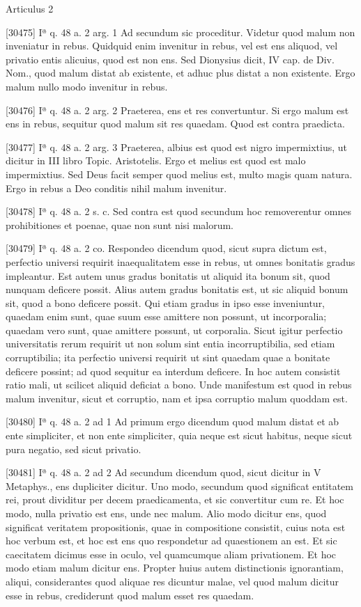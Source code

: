 \documentclass[paper=a4paper,fontsize=10pt,jafontsize=9pt,titlepage]{jlreq}
\begin{document}
Articulus 2

[30475] Iª q. 48 a. 2 arg. 1 Ad secundum sic proceditur. Videtur quod malum non inveniatur in rebus. Quidquid enim invenitur in rebus, vel est ens aliquod, vel privatio entis alicuius, quod est non ens. Sed Dionysius dicit, IV cap. de Div. Nom., quod malum distat ab existente, et adhuc plus distat a non existente. Ergo malum nullo modo invenitur in rebus.

[30476] Iª q. 48 a. 2 arg. 2 Praeterea, ens et res convertuntur. Si ergo malum est ens in rebus, sequitur quod malum sit res quaedam. Quod est contra praedicta.

[30477] Iª q. 48 a. 2 arg. 3 Praeterea, albius est quod est nigro impermixtius, ut dicitur in III libro Topic. Aristotelis. Ergo et melius est quod est malo impermixtius. Sed Deus facit semper quod melius est, multo magis quam natura. Ergo in rebus a Deo conditis nihil malum invenitur.

[30478] Iª q. 48 a. 2 s. c. Sed contra est quod secundum hoc removerentur omnes prohibitiones et poenae, quae non sunt nisi malorum.

[30479] Iª q. 48 a. 2 co. Respondeo dicendum quod, sicut supra dictum est, perfectio universi requirit inaequalitatem esse in rebus, ut omnes bonitatis gradus impleantur. Est autem unus gradus bonitatis ut aliquid ita bonum sit, quod nunquam deficere possit. Alius autem gradus bonitatis est, ut sic aliquid bonum sit, quod a bono deficere possit. Qui etiam gradus in ipso esse inveniuntur, quaedam enim sunt, quae suum esse amittere non possunt, ut incorporalia; quaedam vero sunt, quae amittere possunt, ut corporalia. Sicut igitur perfectio universitatis rerum requirit ut non solum sint entia incorruptibilia, sed etiam corruptibilia; ita perfectio universi requirit ut sint quaedam quae a bonitate deficere possint; ad quod sequitur ea interdum deficere. In hoc autem consistit ratio mali, ut scilicet aliquid deficiat a bono. Unde manifestum est quod in rebus malum invenitur, sicut et corruptio, nam et ipsa corruptio malum quoddam est.

[30480] Iª q. 48 a. 2 ad 1 Ad primum ergo dicendum quod malum distat et ab ente simpliciter, et non ente simpliciter, quia neque est sicut habitus, neque sicut pura negatio, sed sicut privatio.

[30481] Iª q. 48 a. 2 ad 2 Ad secundum dicendum quod, sicut dicitur in V Metaphys., ens dupliciter dicitur. Uno modo, secundum quod significat entitatem rei, prout dividitur per decem praedicamenta, et sic convertitur cum re. Et hoc modo, nulla privatio est ens, unde nec malum. Alio modo dicitur ens, quod significat veritatem propositionis, quae in compositione consistit, cuius nota est hoc verbum est, et hoc est ens quo respondetur ad quaestionem an est. Et sic caecitatem dicimus esse in oculo, vel quamcumque aliam privationem. Et hoc modo etiam malum dicitur ens. Propter huius autem distinctionis ignorantiam, aliqui, considerantes quod aliquae res dicuntur malae, vel quod malum dicitur esse in rebus, crediderunt quod malum esset res quaedam.
\end{document}
